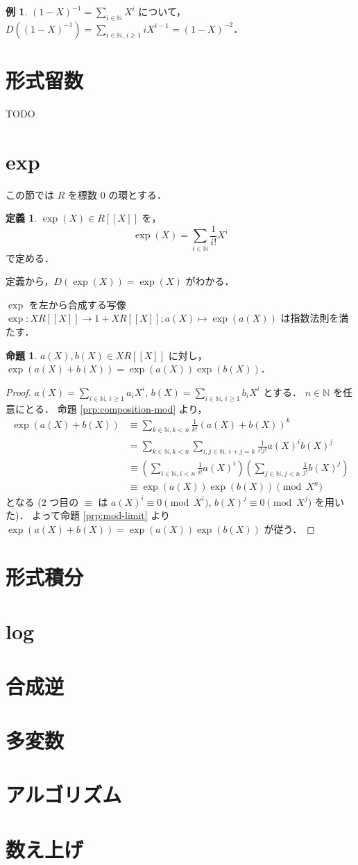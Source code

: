 \documentclass{jsarticle}
\newcommand{\N}{\mathbb{N}}
\newcommand{\longto}{\longrightarrow}
\theoremstyle{definition}
\newtheorem*{Dfn}{定義}
\newtheorem*{Exm}{例}
\newtheorem{Prp}{命題}
\newenvironment{dfn}{\vspace{1ex}\begin{screen}\begin{Dfn}}{\end{Dfn}\end{screen}\vspace{1ex}}
\newenvironment{exm}{\begin{leftbar}\begin{Exm}}{\end{Exm}\end{leftbar}}
\newenvironment{prp}{\vspace{1ex}\begin{screen}\begin{Prp}}{\end{Prp}\end{screen}}
\newenvironment{prf}{\begin{leftbar}\begin{proof}}{\end{proof}\end{leftbar}}
\begin{document}
\begin{exm}
  $(1 - X)^{-1} = \sum_{i\in\N} X^i$ について，
  $D((1 - X)^{-1}) = \sum_{i\in\N,\,i\ge 1} i X^{i-1} = (1 - X)^{-2}$．
\end{exm}


\section{形式留数}
TODO


\section{exp}この節では $R$ を標数 $0$ の環とする．

\begin{dfn}
  $\exp(X) \in R[[X]]$ を，
  \[
    \exp(X) = \sum_{i\in\N} \frac{1}{i!} X^i
  \]
  で定める．
\end{dfn}

定義から，$D(\exp(X)) = \exp(X)$ がわかる．

$\exp$ を左から合成する写像 $\exp\colon X R[[X]] \longto 1 + X R[[X]]; a(X) \longmapsto \exp(a(X))$ は指数法則を満たす．

\begin{prp}
  $a(X), b(X) \in X R[[X]]$ に対し，$\exp(a(X) + b(X)) = \exp(a(X)) \exp(b(X))$．
\end{prp}
\begin{prf}
  $a(X) = \sum_{i\in\N,\,i\ge 1} a_i X^i$, $b(X) = \sum_{i\in\N,\,i\ge 1} b_i X^i$ とする．
  $n \in \N$ を任意にとる．
  命題 \ref{prp:composition-mod} より，
  \begin{align*}
    \exp(a(X) + b(X))
    &\equiv \sum_{k\in\N,k<n} \frac{1}{k!} (a(X) + b(X))^k \\
    &= \sum_{k\in\N,k<n} \sum_{i,j\in\N,\,i+j=k} \frac{1}{i! j!} a(X)^i b(X)^j \\
    &\equiv \left(\sum_{i\in\N,i<n} \frac{1}{i!} a(X)^i\right) \left(\sum_{j\in\N,j<n} \frac{1}{j!} b(X)^j\right) \\
    &\equiv \exp(a(X)) \exp(b(X))
    \pmod{X^n}
  \end{align*}
  となる ($2$ つ目の $\equiv$ は $a(X)^i \equiv 0 \pmod{X^i}$, $b(X)^j \equiv 0 \pmod{X^j}$ を用いた)．
  よって命題 \ref{prp:mod-limit} より $\exp(a(X) + b(X)) = \exp(a(X)) \exp(b(X))$ が従う．
\end{prf}




\section{形式積分}
\section{log}
\section{合成逆}
\section{多変数}
\section{アルゴリズム}
\section{数え上げ}
\end{document}
